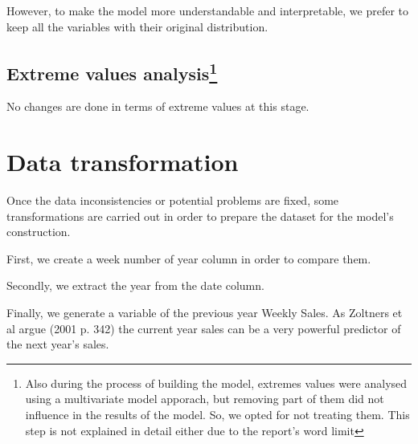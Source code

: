 \documentclass[11pt,]{article}
\newenvironment{Shaded}{\begin{snugshade}}{\end{snugshade}}
\newcommand{\KeywordTok}[1]{\textcolor[rgb]{0.13,0.29,0.53}{\textbf{{#1}}}}
\newcommand{\DecValTok}[1]{\textcolor[rgb]{0.00,0.00,0.81}{{#1}}}
\newcommand{\StringTok}[1]{\textcolor[rgb]{0.31,0.60,0.02}{{#1}}}
\newcommand{\CommentTok}[1]{\textcolor[rgb]{0.56,0.35,0.01}{\textit{{#1}}}}
\newcommand{\NormalTok}[1]{{#1}}
\let\rmarkdownfootnote\footnote%
\def\footnote{\protect\rmarkdownfootnote}
\begin{document}
However, to make the model more understandable and interpretable, we
prefer to keep all the variables with their original distribution.

\subsection[Extreme values analysis]{\texorpdfstring{Extreme values
analysis\footnote{Also during the process of building the model,
  extremes values were analysed using a multivariate model apporach, but
  removing part of them did not influence in the results of the model.
  So, we opted for not treating them. This step is not explained in
  detail either due to the report's word limit}}{Extreme values analysis}}\label{extreme-values-analysis}

No changes are done in terms of extreme values at this stage.

\section{Data transformation}\label{data-transformation}

Once the data inconsistencies or potential problems are fixed, some
transformations are carried out in order to prepare the dataset for the
model's construction.

First, we create a week number of year column in order to compare them.

\begin{Shaded}
\end{Shaded}

Secondly, we extract the year from the date column.

\begin{Shaded}
\end{Shaded}

Finally, we generate a variable of the previous year Weekly Sales. As
Zoltners et al argue (2001 p. 342) the current year sales can be a very
powerful predictor of the next year's sales.
\end{document}
